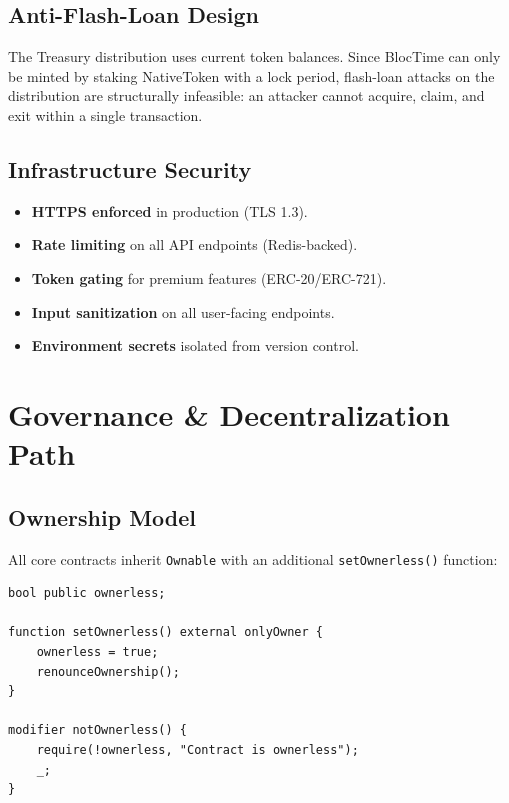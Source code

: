 \documentclass[11pt,a4paper]{article}
\begin{document}
\subsection{Anti-Flash-Loan Design}

The Treasury distribution uses current token balances. Since BlocTime can only be minted by staking NativeToken with a lock period, flash-loan attacks on the distribution are structurally infeasible: an attacker cannot acquire, claim, and exit within a single transaction.

\subsection{Infrastructure Security}

\begin{itemize}
    \item \textbf{HTTPS enforced} in production (TLS 1.3).
    \item \textbf{Rate limiting} on all API endpoints (Redis-backed).
    \item \textbf{Token gating} for premium features (ERC-20/ERC-721).
    \item \textbf{Input sanitization} on all user-facing endpoints.
    \item \textbf{Environment secrets} isolated from version control.
\end{itemize}

\section{Governance \& Decentralization Path}
\label{sec:governance}

\subsection{Ownership Model}

All core contracts inherit \texttt{Ownable} with an additional \texttt{setOwnerless()} function:

\begin{lstlisting}[style=solidity]
bool public ownerless;

function setOwnerless() external onlyOwner {
    ownerless = true;
    renounceOwnership();
}

modifier notOwnerless() {
    require(!ownerless, "Contract is ownerless");
    _;
}
\end{lstlisting}
\end{document}
